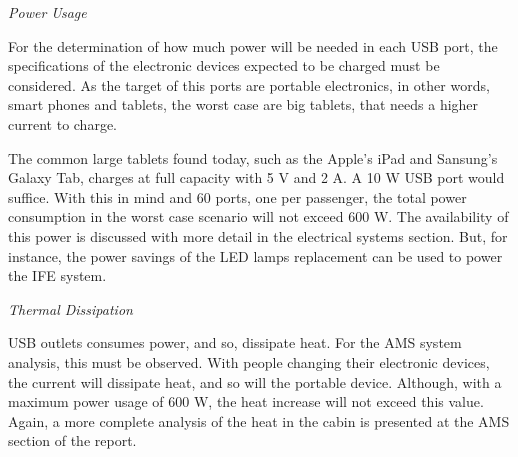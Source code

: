 \textit{Power Usage}

For the determination of how much power will be needed in each USB port, the specifications of the electronic devices expected to be charged must be considered. As the target of this ports are portable electronics, in other words, smart phones and tablets, the worst case are big tablets, that needs a higher current to charge.

The common large tablets found today, such as the Apple's iPad and Sansung's Galaxy Tab, charges at full capacity with 5 V and 2 A. A 10 W USB port would suffice. With this in mind and 60 ports, one per passenger, the total power consumption in the worst case scenario will not exceed 600 W. The availability of this power is discussed with more detail in the electrical systems section. But, for instance, the power savings of the LED lamps replacement can be used to power the IFE system.

\textit{Thermal Dissipation}

USB outlets consumes power, and so, dissipate heat. For the AMS system analysis, this must be observed. With people changing their electronic devices, the current will dissipate heat, and so will the portable device. Although, with a maximum power usage of 600 W, the heat increase will not exceed this value. Again, a more complete analysis of the heat in the cabin is presented at the AMS section of the report.
